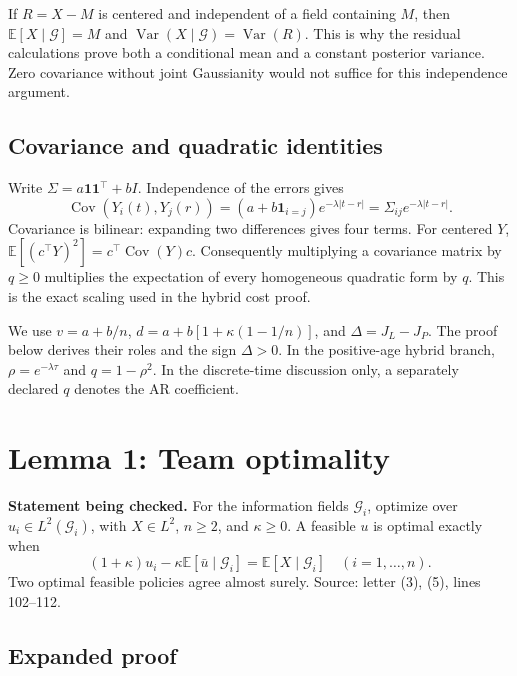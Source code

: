 \documentclass[12pt,letterpaper]{article}
\newcommand{\E}{\mathbb E}
\newcommand{\Var}{\operatorname{Var}}
\newcommand{\Cov}{\operatorname{Cov}}
\newcommand{\one}{\mathbf1}
\newcommand{\G}{\mathcal G}
\begin{document}
If $R=X-M$ is centered and independent of a field containing $M$, then $\E[X\mid\G]=M$ and $\Var(X\mid\G)=\Var(R)$. This is why the residual calculations prove both a conditional mean and a constant posterior variance. Zero covariance without joint Gaussianity would not suffice for this independence argument.

\subsection{Covariance and quadratic identities}
Write $\Sigma=a\one\one^\top+bI$. Independence of the errors gives
\[
\Cov(Y_i(t),Y_j(r))=(a+b\mathbf1_{i=j})e^{-\lambda|t-r|}
=\Sigma_{ij}e^{-\lambda|t-r|}.
\]
Covariance is bilinear: expanding two differences gives four terms. For centered $Y$, $\E[(c^\top Y)^2]=c^\top\Cov(Y)c$. Consequently multiplying a covariance matrix by $q\ge0$ multiplies the expectation of every homogeneous quadratic form by $q$. This is the exact scaling used in the hybrid cost proof.

We use $v=a+b/n$, $d=a+b[1+\kappa(1-1/n)]$, and $\Delta=J_L-J_P$. The proof below derives their roles and the sign $\Delta>0$. In the positive-age hybrid branch, $\rho=e^{-\lambda\tau}$ and $q=1-\rho^2$. In the discrete-time discussion only, a separately declared $q$ denotes the AR coefficient.

\clearpage
\section{Lemma 1: Team optimality}\label{contract-L}

\textbf{Statement being checked.}
For the information fields $\mathcal G_i$, optimize over $u_i\in L^2(\mathcal G_i)$, with $X\in L^2$, $n\ge2$, and $\kappa\ge0$. A feasible $u$ is optimal exactly when
\[
(1+\kappa)u_i-\kappa\E[\bar u\mid\mathcal G_i]=\E[X\mid\mathcal G_i]\quad(i=1,\ldots,n).
\]
Two optimal feasible policies agree almost surely.
\noindent Source: letter (3), (5), lines 102--112.

\subsection*{Expanded proof}
\end{document}
